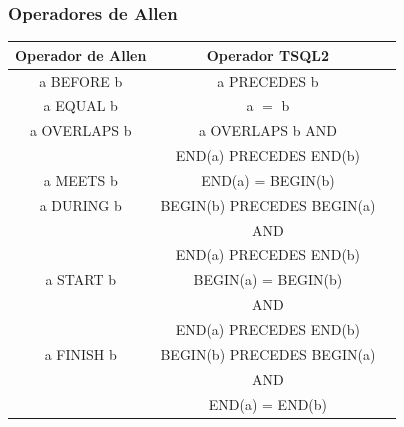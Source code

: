 \documentclass[a4paper,12pt,oneside]{report}
\begin{document}
\subsubsection*{Operadores de Allen}
\begin{center}
\begin{small}
\begin{tabular}{| c | c | c |}
\hline
Operador de Allen & Operador TSQL2\\
\hline
\hline
a BEFORE b & a PRECEDES b\\
\hline
a EQUAL b & a $=$ b\\
\hline
a OVERLAPS b & a OVERLAPS b AND \\ & END(a) PRECEDES END(b)\\
\hline
a MEETS b & END(a) = BEGIN(b)\\
\hline
a DURING b & BEGIN(b) PRECEDES BEGIN(a)\\
& AND\\
& END(a) PRECEDES END(b)\\
\hline
a START b & BEGIN(a) = BEGIN(b)\\
& AND\\
& END(a) PRECEDES END(b)\\
\hline
a FINISH b & BEGIN(b) PRECEDES BEGIN(a)\\
& AND\\
& END(a) = END(b)\\
\hline
\end{tabular}
\end{small}
\end{center}
\end{document}
